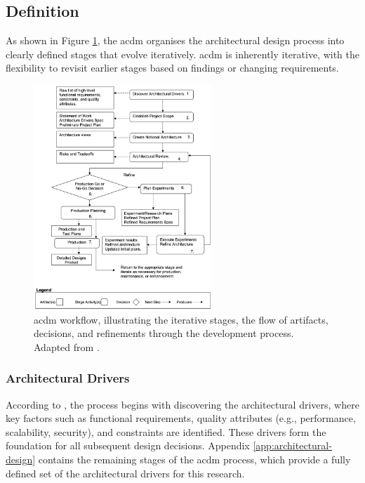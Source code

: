 
\subsection{Definition}

As shown in Figure \ref{fig:acdm_workflow}, the \ac{acdm} organises the architectural design process into clearly defined stages that evolve iteratively. \ac{acdm} is inherently iterative, with the flexibility to revisit earlier stages based on findings or changing requirements.

\begin{figure}[!htb]
    \includegraphics[width=0.6\textwidth]{figs/chapter3/acdm_workflow.png}
    \centering
    \caption[\acl{acdm} Workflow]{\ac{acdm} workflow, illustrating the iterative stages, the flow of artifacts, decisions, and refinements through the development process. Adapted from .}
    \label{fig:acdm_workflow}
\end{figure}

\subsubsection{Architectural Drivers}

According to , the process begins with discovering the architectural drivers, where key factors such as functional requirements, quality attributes (e.g., performance, scalability, security), and constraints are identified. These drivers form the foundation for all subsequent design decisions. Appendix \ref{app:architectural-design} contains the remaining stages of the \ac{acdm} process, which provide a fully defined set of the architectural drivers for this research.

